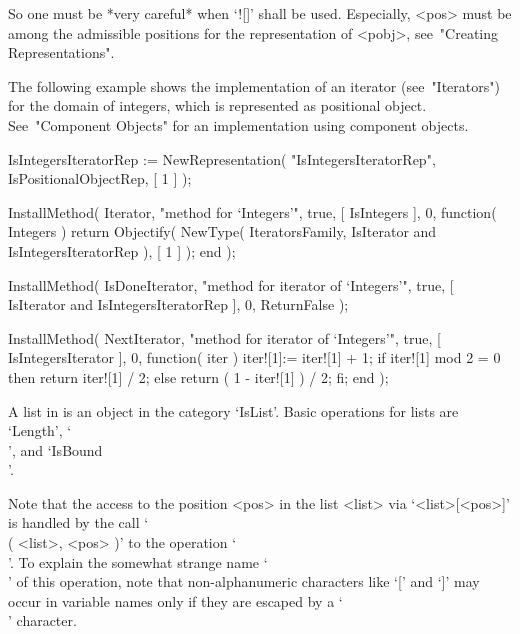 So one must be *very careful* when `![]' shall be used.
Especially, <pos> must be among the admissible positions for
the representation of <pobj>, see~"Creating Representations".

The following example shows the implementation of an iterator
(see~"Iterators") for the domain of integers,
which is represented as positional object.
See~"Component Objects" for an implementation using component objects.

\begintt
    IsIntegersIteratorRep := NewRepresentation( "IsIntegersIteratorRep",
        IsPositionalObjectRep, [ 1 ] );

    InstallMethod( Iterator,
        "method for `Integers'",
        true,
        [ IsIntegers ], 0,
        function( Integers )
        return Objectify( NewType( IteratorsFamily,
                                       IsIterator
                                   and IsIntegersIteratorRep ),
                          [ 1 ] );
        end );

    InstallMethod( IsDoneIterator,
        "method for iterator of `Integers'",
        true,
        [ IsIterator and IsIntegersIteratorRep ], 0,
        ReturnFalse );

    InstallMethod( NextIterator,
        "method for iterator of `Integers'",
        true,
        [ IsIntegersIterator ], 0,
        function( iter )
        iter![1]:= iter![1] + 1;
        if iter![1] mod 2 = 0 then
          return iter![1] / 2;
        else
          return ( 1 - iter![1] ) / 2;
        fi;
        end );
\endtt


A list in {\GAP} is an object in the category `IsList'.
Basic operations for lists are `Length', `\\[\\]', and `IsBound\\[\\]'.

Note that the access to the position <pos> in the list <list>
via `<list>[<pos>]' is handled by the call `\\[\\]( <list>, <pos> )'
to the operation `\\[\\]'.
To explain the somewhat strange name `\\[\\]' of this operation,
note that non-alphanumeric characters like `[' and `]' may occur in
{\GAP} variable names only if they are escaped by a `\\' character.

